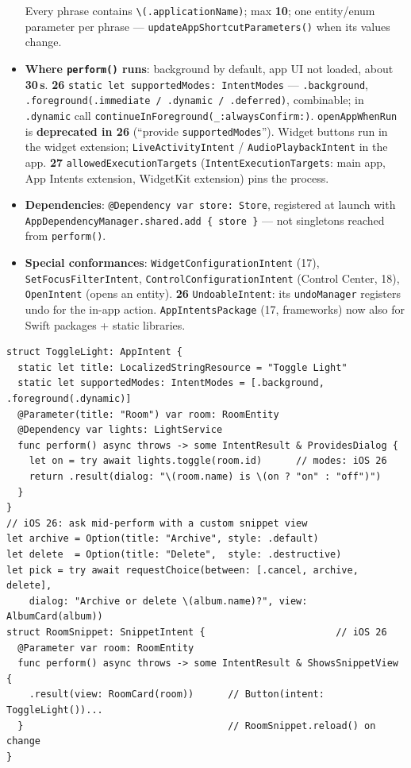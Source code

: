 \documentclass[8pt]{extarticle}
\newcommand\ct[1]{\texttt{#1}}
\newcommand\hd[1]{\par\vspace{3pt}\noindent{\bfseries\color{sheetBlue}#1}\par\vspace{1pt}}
\newcommand\vv[1]{\textcolor{sheetOrange}{\textbf{#1}}}
\begin{document}
\begin{multicols}{2}
\begin{itemize}
        Every phrase contains \ct{\textbackslash(.applicationName)}; max \textbf{10}; one entity/enum
        parameter per phrase — \ct{updateAppShortcutParameters()} when its values change.
  \item \textbf{Where \ct{perform()} runs}: background by default, app UI not loaded, about
        \textbf{30\,s}. \vv{26} \ct{static let supportedModes: IntentModes} — \ct{.background},
        \ct{.foreground(.immediate / .dynamic / .deferred)}, combinable; in \ct{.dynamic} call
        \ct{continueInForeground(\_:alwaysConfirm:)}. \ct{openAppWhenRun} is \textbf{deprecated in 26}
        (``provide \ct{supportedModes}''). Widget buttons run in the widget extension;
        \ct{LiveActivityIntent} / \ct{AudioPlaybackIntent} in the app.
        \vv{27} \ct{allowedExecutionTargets} (\ct{IntentExecutionTargets}: main app, App Intents
        extension, WidgetKit extension) pins the process.
  \item \textbf{Dependencies}: \ct{@Dependency var store: Store}, registered at launch with
        \ct{AppDependencyManager.shared.add \{ store \}} — not singletons reached from \ct{perform()}.
  \item \textbf{Special conformances}: \ct{WidgetConfigurationIntent} (17), \ct{SetFocusFilterIntent},
        \ct{ControlConfigurationIntent} (Control Center, 18), \ct{OpenIntent} (opens an entity).
        \vv{26} \ct{UndoableIntent}: its \ct{undoManager} registers undo for the in-app action.
        \ct{AppIntentsPackage} (17, frameworks) now also for Swift packages + static libraries.
\end{itemize}

\hd{Example}
\begin{lstlisting}[language=SwiftSheet]
struct ToggleLight: AppIntent {
  static let title: LocalizedStringResource = "Toggle Light"
  static let supportedModes: IntentModes = [.background, .foreground(.dynamic)]
  @Parameter(title: "Room") var room: RoomEntity
  @Dependency var lights: LightService
  func perform() async throws -> some IntentResult & ProvidesDialog {
    let on = try await lights.toggle(room.id)      // modes: iOS 26
    return .result(dialog: "\(room.name) is \(on ? "on" : "off")")
  }
}
// iOS 26: ask mid-perform with a custom snippet view
let archive = Option(title: "Archive", style: .default)
let delete  = Option(title: "Delete",  style: .destructive)
let pick = try await requestChoice(between: [.cancel, archive, delete],
    dialog: "Archive or delete \(album.name)?", view: AlbumCard(album))
struct RoomSnippet: SnippetIntent {                       // iOS 26
  @Parameter var room: RoomEntity
  func perform() async throws -> some IntentResult & ShowsSnippetView {
    .result(view: RoomCard(room))      // Button(intent: ToggleLight())...
  }                                    // RoomSnippet.reload() on change
}
\end{lstlisting}


\end{multicols}
\end{document}
